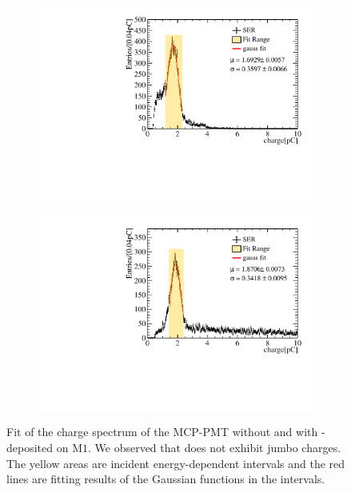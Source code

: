 \begin{figure}[!ht]
	\centering
	\begin{subfigure}[b]{0.48\textwidth}
		\centering
		\includegraphics[width=\textwidth]{PMTRelated/GTmodel/fit_noald.pdf}
		\caption{}
		\label{fig:gain_noald}
	\end{subfigure}
	\hfill
	\begin{subfigure}[b]{0.48\textwidth}
		\centering
		\includegraphics[width=\textwidth]{PMTRelated/GTmodel/fit_ald.pdf}
		\caption{}
		\label{fig:gain_ald}
	\end{subfigure}

	\caption{Fit of the charge spectrum of the MCP-PMT without  and with 
		- deposited on $\mathrm{M}1$.
		We observed that  does not exhibit jumbo charges.
		The yellow areas are incident energy-dependent intervals and
		the red lines are fitting results of the Gaussian functions in the intervals.
	}
	\label{fig:gain_fit}
\end{figure}

